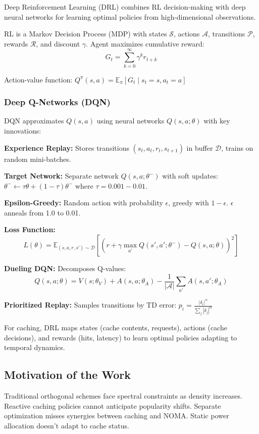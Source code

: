 \documentclass[12pt,a4paper]{article}
\begin{document}
Deep Reinforcement Learning (DRL) combines RL decision-making with deep neural networks for learning optimal policies from high-dimensional observations.

RL is a Markov Decision Process (MDP) with states $\mathcal{S}$, actions $\mathcal{A}$, transitions $\mathcal{P}$, rewards $\mathcal{R}$, and discount $\gamma$. Agent maximizes cumulative reward:
\[
G_t = \sum_{k=0}^{\infty} \gamma^k r_{t+k}
\]

Action-value function: $Q^\pi(s,a) = \mathbb{E}_\pi[ G_t \mid s_t = s, a_t = a ]$

\subsubsection{Deep Q-Networks (DQN)}

DQN approximates $Q(s,a)$ using neural networks $Q(s,a;\theta)$ with key innovations:

\textbf{Experience Replay:} Stores transitions $(s_t, a_t, r_t, s_{t+1})$ in buffer $\mathcal{D}$, trains on random mini-batches.

\textbf{Target Network:} Separate network $Q(s,a;\theta^-)$ with soft updates: $\theta^- \leftarrow \tau \theta + (1-\tau) \theta^-$ where $\tau = 0.001-0.01$.

\textbf{Epsilon-Greedy:} Random action with probability $\epsilon$, greedy with $1-\epsilon$. $\epsilon$ anneals from 1.0 to 0.01.

\textbf{Loss Function:}
\[
L(\theta) = \mathbb{E}_{(s,a,r,s') \sim \mathcal{D}} \left[ \left( r + \gamma \max_{a'} Q(s',a';\theta^-) - Q(s,a;\theta) \right)^2 \right]
\]

\textbf{Dueling DQN:} Decomposes Q-values:
\[
Q(s,a;\theta) = V(s;\theta_V) + A(s,a;\theta_A) - \frac{1}{|\mathcal{A}|}\sum_{a'} A(s,a';\theta_A)
\]

\textbf{Prioritized Replay:} Samples transitions by TD error: $p_i = \frac{|\delta_i|^\alpha}{\sum_j |\delta_j|^\alpha}$

For caching, DRL maps states (cache contents, requests), actions (cache decisions), and rewards (hits, latency) to learn optimal policies adapting to temporal dynamics.

\subsection{Motivation of the Work}

Traditional orthogonal schemes face spectral constraints as density increases. Reactive caching policies cannot anticipate popularity shifts. Separate optimization misses synergies between caching and NOMA. Static power allocation doesn't adapt to cache status.
\end{document}
